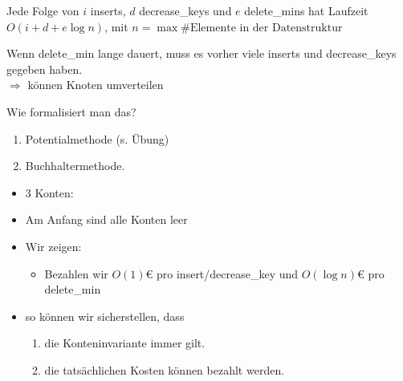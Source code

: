 \begin{description}
 \item[zu zeigen: ] Jede Folge von $i$ inserts, $d$ decrease\_keys und $e$ delete\_mins hat Laufzeit $O(i + d + e \log n)$, mit $n = \max \#\text{Elemente in der Datenstruktur}$
 \item[Idee: ] Wenn delete\_min lange dauert, muss es vorher viele inserts und decrease\_keys gegeben haben.\\
         $\Rightarrow$ können Knoten umverteilen
 \item Wie formalisiert man das?
     \renewcommand{\theenumi}{\alph{enumi}}
     \begin{enumerate}
      \item Potentialmethode (s. Übung)
      \item Buchhaltermethode.
     \end{enumerate}
     \begin{itemize}
      \item 3 Konten:
      \item Am Anfang sind alle Konten leer
      \item Wir zeigen:
          \begin{itemize}
          \item Bezahlen wir $O(1) \euro$ pro insert/decrease\_key und $O(\log n) \euro$ pro delete\_min
          \end{itemize}
      \item so können wir sicherstellen, dass
      \renewcommand{\theenumi}{\roman{enumi}}
     \begin{enumerate}
      \item die Konteninvariante immer gilt.
      \item die tatsächlichen Kosten können bezahlt werden.
     \end{enumerate}
\end{itemize}
\end{description}
